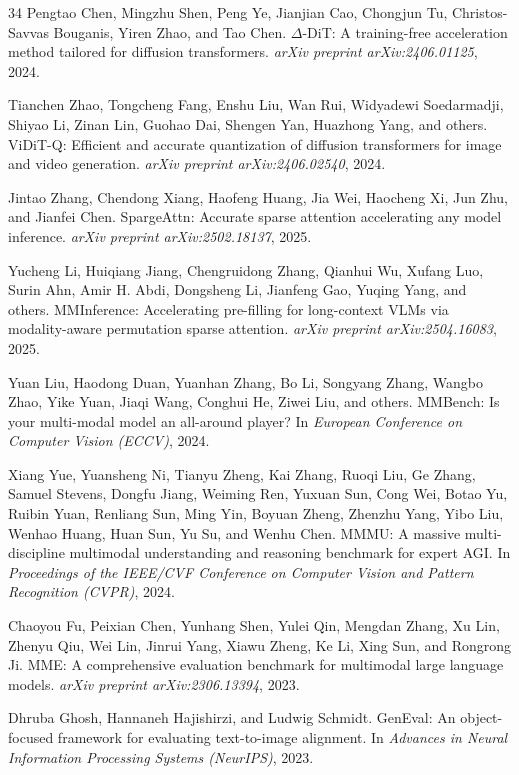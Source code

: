 \documentclass{article}
\begin{document}
\begin{thebibliography}{34}
Pengtao Chen, Mingzhu Shen, Peng Ye, Jianjian Cao, Chongjun Tu, Christos-Savvas Bouganis, Yiren Zhao, and Tao Chen.
\newblock $\Delta$-DiT: A training-free acceleration method tailored for diffusion transformers.
\newblock \emph{arXiv preprint arXiv:2406.01125}, 2024.

Tianchen Zhao, Tongcheng Fang, Enshu Liu, Wan Rui, Widyadewi Soedarmadji, Shiyao Li, Zinan Lin, Guohao Dai, Shengen Yan, Huazhong Yang, and others.
\newblock ViDiT-Q: Efficient and accurate quantization of diffusion transformers for image and video generation.
\newblock \emph{arXiv preprint arXiv:2406.02540}, 2024.

Jintao Zhang, Chendong Xiang, Haofeng Huang, Jia Wei, Haocheng Xi, Jun Zhu, and Jianfei Chen.
\newblock SpargeAttn: Accurate sparse attention accelerating any model inference.
\newblock \emph{arXiv preprint arXiv:2502.18137}, 2025.

Yucheng Li, Huiqiang Jiang, Chengruidong Zhang, Qianhui Wu, Xufang Luo, Surin Ahn, Amir H. Abdi, Dongsheng Li, Jianfeng Gao, Yuqing Yang, and others.
\newblock MMInference: Accelerating pre-filling for long-context VLMs via modality-aware permutation sparse attention.
\newblock \emph{arXiv preprint arXiv:2504.16083}, 2025.

Yuan Liu, Haodong Duan, Yuanhan Zhang, Bo Li, Songyang Zhang, Wangbo Zhao, Yike Yuan, Jiaqi Wang, Conghui He, Ziwei Liu, and others.
\newblock MMBench: Is your multi-modal model an all-around player?
\newblock In \emph{European Conference on Computer Vision (ECCV)}, 2024.

Xiang Yue, Yuansheng Ni, Tianyu Zheng, Kai Zhang, Ruoqi Liu, Ge Zhang, Samuel Stevens, Dongfu Jiang, Weiming Ren, Yuxuan Sun, Cong Wei, Botao Yu, Ruibin Yuan, Renliang Sun, Ming Yin, Boyuan Zheng, Zhenzhu Yang, Yibo Liu, Wenhao Huang, Huan Sun, Yu Su, and Wenhu Chen.
\newblock MMMU: A massive multi-discipline multimodal understanding and reasoning benchmark for expert AGI.
\newblock In \emph{Proceedings of the IEEE/CVF Conference on Computer Vision and Pattern Recognition (CVPR)}, 2024.

Chaoyou Fu, Peixian Chen, Yunhang Shen, Yulei Qin, Mengdan Zhang, Xu Lin, Zhenyu Qiu, Wei Lin, Jinrui Yang, Xiawu Zheng, Ke Li, Xing Sun, and Rongrong Ji.
\newblock MME: A comprehensive evaluation benchmark for multimodal large language models.
\newblock \emph{arXiv preprint arXiv:2306.13394}, 2023.

Dhruba Ghosh, Hannaneh Hajishirzi, and Ludwig Schmidt.
\newblock GenEval: An object-focused framework for evaluating text-to-image alignment.
\newblock In \emph{Advances in Neural Information Processing Systems (NeurIPS)}, 2023.
\end{thebibliography}
\end{document}
